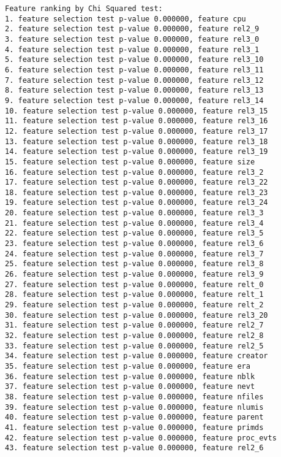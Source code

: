 \begin{verbatim}
Feature ranking by Chi Squared test:
1. feature selection test p-value 0.000000, feature cpu
2. feature selection test p-value 0.000000, feature rel2_9
3. feature selection test p-value 0.000000, feature rel3_0
4. feature selection test p-value 0.000000, feature rel3_1
5. feature selection test p-value 0.000000, feature rel3_10
6. feature selection test p-value 0.000000, feature rel3_11
7. feature selection test p-value 0.000000, feature rel3_12
8. feature selection test p-value 0.000000, feature rel3_13
9. feature selection test p-value 0.000000, feature rel3_14
10. feature selection test p-value 0.000000, feature rel3_15
11. feature selection test p-value 0.000000, feature rel3_16
12. feature selection test p-value 0.000000, feature rel3_17
13. feature selection test p-value 0.000000, feature rel3_18
14. feature selection test p-value 0.000000, feature rel3_19
15. feature selection test p-value 0.000000, feature size
16. feature selection test p-value 0.000000, feature rel3_2
17. feature selection test p-value 0.000000, feature rel3_22
18. feature selection test p-value 0.000000, feature rel3_23
19. feature selection test p-value 0.000000, feature rel3_24
20. feature selection test p-value 0.000000, feature rel3_3
21. feature selection test p-value 0.000000, feature rel3_4
22. feature selection test p-value 0.000000, feature rel3_5
23. feature selection test p-value 0.000000, feature rel3_6
24. feature selection test p-value 0.000000, feature rel3_7
25. feature selection test p-value 0.000000, feature rel3_8
26. feature selection test p-value 0.000000, feature rel3_9
27. feature selection test p-value 0.000000, feature relt_0
28. feature selection test p-value 0.000000, feature relt_1
29. feature selection test p-value 0.000000, feature relt_2
30. feature selection test p-value 0.000000, feature rel3_20
31. feature selection test p-value 0.000000, feature rel2_7
32. feature selection test p-value 0.000000, feature rel2_8
33. feature selection test p-value 0.000000, feature rel2_5
34. feature selection test p-value 0.000000, feature creator
35. feature selection test p-value 0.000000, feature era
36. feature selection test p-value 0.000000, feature nblk
37. feature selection test p-value 0.000000, feature nevt
38. feature selection test p-value 0.000000, feature nfiles
39. feature selection test p-value 0.000000, feature nlumis
40. feature selection test p-value 0.000000, feature parent
41. feature selection test p-value 0.000000, feature primds
42. feature selection test p-value 0.000000, feature proc_evts
43. feature selection test p-value 0.000000, feature rel2_6

\end{verbatim}
